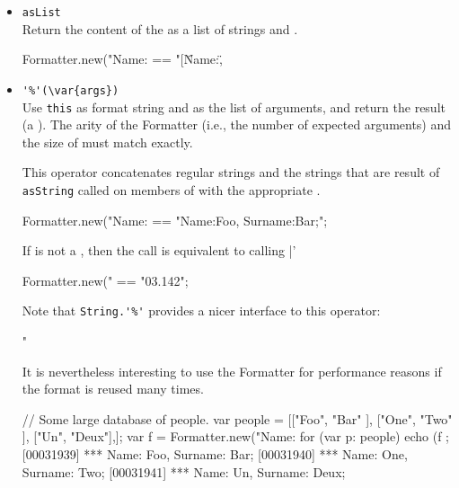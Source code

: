 \begin{itemize}
\item \lstinline|asList|\\
  Return the content of the  as a list of strings and
  .
\begin{urbiassert}[firstnumber=last]
Formatter.new("Name:%
       == "[\"Name:\", %
\end{urbiassert}

\item \lstinline|'%'(\var{args})|\\
  Use \lstinline|this| as format string and  as the list of
  arguments, and return the result (a ).  The arity
  of the Formatter (i.e., the number of expected arguments) and the
  size of  must match exactly.

  This operator concatenates regular strings and the strings that are
  result of \lstinline|asString| called on members of  with
  the appropriate .
\begin{urbiassert}[firstnumber=last]
Formatter.new("Name:%
       == "Name:Foo, Surname:Bar;";
\end{urbiassert}

  If  is not a , then the call is equivalent
  to calling |'%
\begin{urbiassert}[firstnumber=last]
Formatter.new("%
       == "03.142";
\end{urbiassert}

  Note that \lstinline|String.'%'| provides a nicer interface to this
  operator:
\begin{urbiassert}[firstnumber=last]
"%
\end{urbiassert}

  It is nevertheless interesting to use the Formatter for performance
  reasons if the format is reused many times.
\begin{urbiscript}[firstnumber=last]
{
  // Some large database of people.
  var people =
    [["Foo", "Bar" ],
     ["One", "Two" ],
     ["Un",  "Deux"],];
  var f = Formatter.new("Name:%
  for (var p: people)
    echo (f %
};
[00031939] *** Name:    Foo, Surname:    Bar;
[00031940] *** Name:    One, Surname:    Two;
[00031941] *** Name:     Un, Surname:   Deux;
\end{urbiscript}


\end{itemize}
